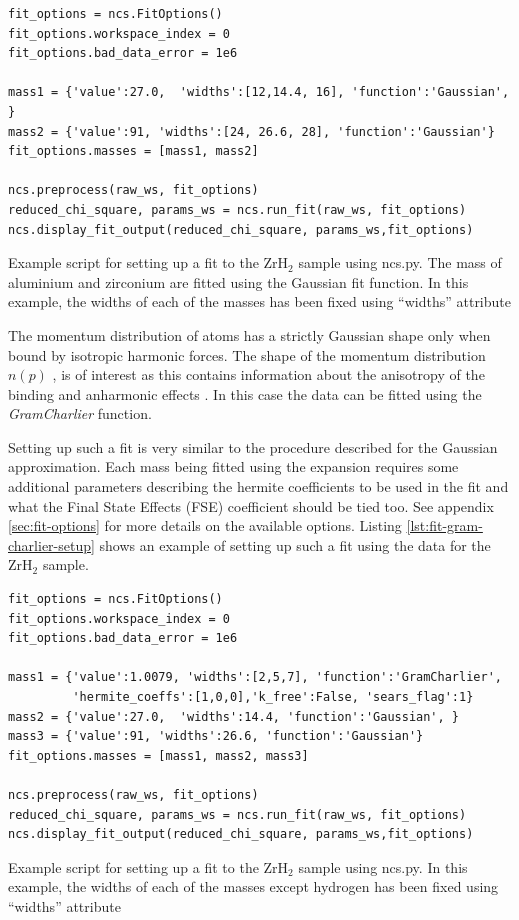 \documentclass[paper=a4, fontsize=11pt]{scrartcl}	%
\numberwithin{equation}{section}															%
\numberwithin{figure}{section}																%
\numberwithin{table}{section}
\begin{document}
\begin{listing}[H]
\begin{verbatim}
fit_options = ncs.FitOptions()
fit_options.workspace_index = 0
fit_options.bad_data_error = 1e6

mass1 = {'value':27.0,  'widths':[12,14.4, 16], 'function':'Gaussian', }
mass2 = {'value':91, 'widths':[24, 26.6, 28], 'function':'Gaussian'}
fit_options.masses = [mass1, mass2]

ncs.preprocess(raw_ws, fit_options)
reduced_chi_square, params_ws = ncs.run_fit(raw_ws, fit_options)
ncs.display_fit_output(reduced_chi_square, params_ws,fit_options)
\end{verbatim}
\caption{Example script for setting up a fit to the ZrH$_2$ sample using ncs.py. The mass of aluminium and zirconium are fitted using the Gaussian fit function. In this example, the widths of each of the masses has been fixed using ``widths'' attribute}
\label{lst:fit-setup}
\end{listing}

The momentum distribution of atoms has a strictly Gaussian shape only when bound by isotropic harmonic forces. The shape of the momentum distribution $n(p)$ \cite{mayers2004vesuvio}, is of interest as this contains information about the anisotropy of the binding and anharmonic effects \cite{andreani2005measurement}. In this case the data can be fitted using the \textit{GramCharlier} function. 

Setting up such a fit is very similar to the procedure described for the Gaussian approximation. Each mass being fitted using the expansion requires some additional parameters describing the hermite coefficients to be used in the fit and what the Final State Effects (FSE) coefficient should be tied too. See appendix \ref{sec:fit-options} for more details on the available options. Listing \ref{lst:fit-gram-charlier-setup} shows an example of setting up such a fit using the data for the ZrH$_2$ sample.

\begin{listing}[H]
\begin{verbatim}
fit_options = ncs.FitOptions()
fit_options.workspace_index = 0
fit_options.bad_data_error = 1e6

mass1 = {'value':1.0079, 'widths':[2,5,7], 'function':'GramCharlier', 
         'hermite_coeffs':[1,0,0],'k_free':False, 'sears_flag':1}
mass2 = {'value':27.0,  'widths':14.4, 'function':'Gaussian', }
mass3 = {'value':91, 'widths':26.6, 'function':'Gaussian'}
fit_options.masses = [mass1, mass2, mass3]

ncs.preprocess(raw_ws, fit_options)
reduced_chi_square, params_ws = ncs.run_fit(raw_ws, fit_options)
ncs.display_fit_output(reduced_chi_square, params_ws,fit_options)
\end{verbatim}
\caption{Example script for setting up a fit to the ZrH$_2$ sample using ncs.py. In this example, the widths of each of the masses except hydrogen has been fixed using ``widths'' attribute}
\label{lst:fit-gram-charlier-setup}
\end{listing}
\end{document}
